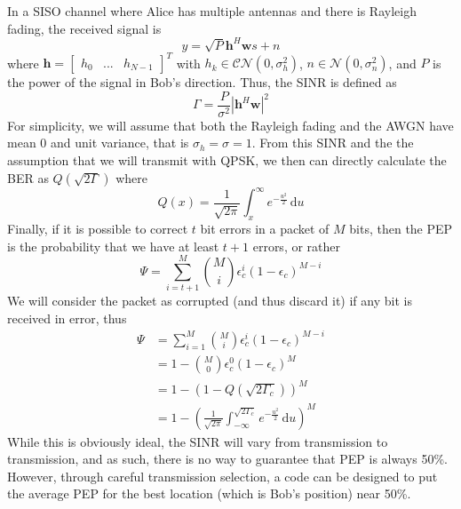 \documentclass[letterpaper, 10 pt, conference]{ieeetran}  %
\theoremstyle{definition}
\theoremstyle{theorem}
\begin{document}
In a SISO channel where Alice has multiple antennas and there is Rayleigh fading, the received signal is
\begin{equation}
y = \sqrt{P}\textbf{h}^{H}\textbf{w}s + n
\end{equation}
where $\textbf{h} = \left[ \begin{matrix} h_{0} & ... & h_{N-1} \end{matrix} \right]^{T}$ with $h_{k} \in \mathscr{CN}(0,\sigma_{h}^{2})$, $n \in \mathscr{N}(0,\sigma_{n}^{2})$, and $P$ is the power of the signal in Bob's direction.  
Thus, the \ac{SINR} is defined as
\begin{equation}
\Gamma = \frac{P}{\sigma^{2}}\left|\textbf{h}^{H}\textbf{w}\right|^{2}
\end{equation}
For simplicity, we will assume that both the Rayleigh fading and the \ac{AWGN} have mean $0$ and unit variance, that is $\sigma_{h} = \sigma = 1$.  
From this \ac{SINR} and the the assumption that we will transmit with \ac{QPSK}, we then can directly calculate the \ac{BER} as $Q(\sqrt{2\Gamma})$ where
\begin{equation}
Q(x) = \frac{1}{\sqrt{2\pi}}\int_{x}^{\infty} e^{-\frac{u^{2}}{2}} \,\mathrm{d}u
\end{equation}
Finally, if it is possible to correct $t$ bit errors in a packet of $M$ bits, then the \ac{PEP} is the probability that we have at least $t+1$ errors, or rather
\begin{equation}
\Psi = \sum_{i=t+1}^{M} \binom{M}{i} \epsilon_{c}^{i}(1-\epsilon_{c})^{M-i}
\end{equation}
We will consider the packet as corrupted (and thus discard it) if any bit is received in error, thus
\begin{align*}
\Psi &= \sum_{i=1}^{M} \binom{M}{i} \epsilon_{c}^{i}(1-\epsilon_{c})^{M-i} \\
&= 1 - \binom{M}{0} \epsilon_{c}^{0}(1-\epsilon_{c})^{M} \\
&= 1 - \left(1-Q\left(\sqrt{2\Gamma_{c}}\right)\right)^{M} \\
&= 1 - \left(\frac{1}{\sqrt{2\pi}}\int_{-\infty}^{\sqrt{2\Gamma_{c}}} e^{-\frac{u^{2}}{2}} \,\mathrm{d}u\right)^{M}
\end{align*}
While this is obviously ideal, the \ac{SINR} will vary from transmission to transmission, and as such, there is no way to guarantee that \ac{PEP} is always 50\%.  
However, through careful transmission selection, a code can be designed to put the average \ac{PEP} for the best location (which is Bob's position) near 50\%.  
\end{document}
